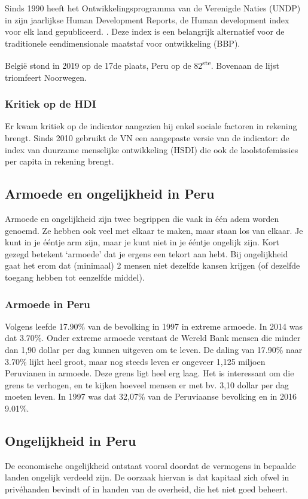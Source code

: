 Sinds 1990 heeft het Ontwikkelingsprogramma van de Verenigde Naties (UNDP) in zijn jaarlijkse Human Development Reports, de Human development index voor elk land gepubliceerd. \autocite{AmbujD.Sagar1997}. Deze index is een belangrijk alternatief voor de traditionele eendimensionale maatstaf voor ontwikkeling (BBP). 

België stond in 2019 op de 17de plaats, Peru op de 82\textsuperscript{ste}. Bovenaan de lijst triomfeert Noorwegen. \autocite{UNDP2019a} 

\subsubsection{Kritiek op de HDI}
Er kwam kritiek op de indicator aangezien hij enkel sociale factoren in rekening brengt. Sinds 2010 gebruikt de VN een aangepaste versie van de indicator: de index van duurzame menselijke ontwikkeling (HSDI) die ook de koolstofemissies per capita in rekening brengt. \autocite{Economie2018}

\subsection{Armoede en ongelijkheid in Peru}
Armoede en ongelijkheid zijn twee begrippen die vaak in één adem worden genoemd. Ze hebben ook veel met elkaar te maken, maar staan los van elkaar. Je kunt in je ééntje arm zijn, maar je kunt niet in je ééntje ongelijk zijn. Kort gezegd betekent ‘armoede’ dat je ergens een tekort aan hebt. Bij ongelijkheid gaat het erom dat (minimaal) 2 mensen niet dezelfde kansen krijgen (of dezelfde toegang hebben tot eenzelfde middel). \autocite{Novib2020}

\subsubsection{Armoede in Peru}
Volgens \autocite{OurWorldInData2016} leefde 17.90\% van de bevolking in 1997 in extreme armoede. In 2014 was dat 3.70\%. Onder extreme armoede verstaat de Wereld Bank mensen die minder dan 1,90 dollar per dag kunnen uitgeven om te leven. De daling van 17.90\% naar 3.70\% lijkt heel groot, maar nog steeds leven er ongeveer 1,125 miljoen Peruvianen in armoede. Deze grens ligt heel erg laag. Het is interessant om die grens te verhogen, en te kijken hoeveel mensen er met bv. 3,10 dollar per dag moeten leven. In 1997 was dat 32,07\% van de Peruviaanse bevolking en in 2016  9.01\%.

\subsection{Ongelijkheid in Peru}
De economische ongelijkheid ontstaat vooral doordat de vermogens in bepaalde landen ongelijk verdeeld zijn. De oorzaak hiervan is dat kapitaal zich ofwel in privéhanden bevindt of in handen van de overheid, die het niet goed beheert. \autocite{Zucman2018}

